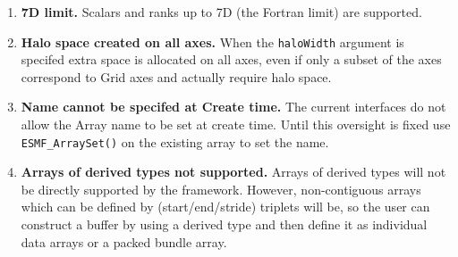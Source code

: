 

\begin{enumerate}

\item {\bf 7D limit.}  Scalars and ranks up to 7D (the Fortran limit) are 
supported.

\item {\bf Halo space created on all axes.}
When the {\tt haloWidth} argument is specifed extra space is allocated
on all axes, even if only a subset of the axes correspond to Grid axes 
and actually require halo space.

\item {\bf Name cannot be specifed at Create time.}
The current interfaces do not allow the Array name to be set at
create time. Until this oversight is fixed use 
{\tt ESMF\_ArraySet()} on the existing array to set the name.

\item {\bf Arrays of derived types not supported.}  Arrays of derived 
types will not be directly supported by the framework.
However, non-contiguous arrays which can be defined by (start/end/stride)
triplets will be, so the user can construct a buffer by using a derived
type and then define it as individual data arrays or a packed bundle array.

\end{enumerate}
